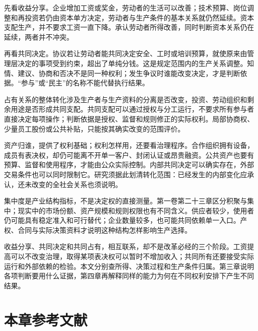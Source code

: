 \documentclass[UTF8,fontset=windows,12pt,a4paper,oneside,openany]{ctexbook}
\begin{document}
先看收益分享。企业增加工资或奖金，劳动者的生活可以改善；技术预算、岗位调整和再投资若仍由资本单方决定，劳动者与生产条件的基本关系就仍然延续。资本支配生产，并不要求工资一直下降。承认劳动者所得改善，同时判断资本关系仍在延续，两者并不冲突。

再看共同决定。协议若让劳动者能共同决定安全、工时或培训预算，就使原来由管理层决定的事项受到约束，超出了单纯分钱。这是规定范围内的生产关系调整。知情、建议、协商和否决不是同一种权利；发生争议时谁能改变决定，才是判断依据。“参与”或“民主”的名称不能代替执行结果。

占有关系的整体转化涉及生产者与生产资料的分离是否改变，投资、劳动组织和剩余用途是否形成共同支配。共同支配可以通过授权与分工运行，不要求所有参与者直接决定每项操作；判断依据是授权、监督和规则修正的实际权利。局部协商权、少量员工股份或公共补贴，只能按其确实改变的范围评价。

资产归谁，提供了权利基础；权利怎样用，还要看治理程序。合作组织拥有设备，成员有表决权，却仍可能离不开单一客户、封闭认证或昂贵融资。公共资产也要有预算、监督和使用程序，才能由公众实际控制。内部共同决定可以确实存在，外部交易条件也可以同时限制它。研究须据此划清转化范围：已经发生的内部变化应承认，还未改变的全社会关系也须说明。

集中度是产业结构指标，不是决定权的直接测量。第一卷第二十三章区分积聚与集中；现实中的市场份额、资产规模和规则权限也有不同含义。供应者较少，使用者仍可能具有稳定准入和可行替代；企业数量较多，也可能共同依赖单一入口。产权、合同与实际决策资料才说明这种结构怎样影响生产选择。

收益分享、共同决定和共同占有，相互联系，却不是改革必经的三个阶段。工资提高可以不改变治理，取得某项表决权可以暂时不增加收入；共同所有还要接受实际运行和外部依赖的检验。本文分别查所得、决策过程和生产条件归属。第三章说明各项判断要用什么证据，第四章再解释同样的能力为何在不同权利安排下产生不同结果。

\section*{本章参考文献}
\end{document}
